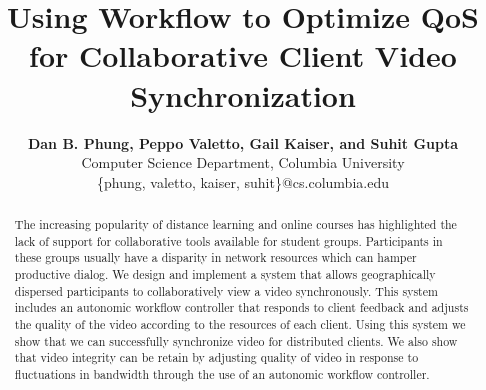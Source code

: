 \documentclass[10pt]{article}
\title{Using Workflow to Optimize QoS for Collaborative Client Video
Synchronization}
\author{
 \textbf{Dan B. Phung, Peppo Valetto, Gail Kaiser, and Suhit Gupta}\\
Computer Science Department, Columbia University\\
\{phung, valetto, kaiser, suhit\}@cs.columbia.edu}
\date{\parbox[b][0ex]{0em}{\hspace*{-12.5em}\raisebox{37ex}{\fbox{For
submission to \emph{ACM-MM 2004}, due 12:00 AM EDT: April 05, 2004.}}}}
\begin{document}
\begin{singlespace}
\maketitle
\end{singlespace}

%
% 
% 
% 
% 
% 
% 



\begin{abstract}\noindent
The increasing popularity of distance learning and online courses has
highlighted the lack of support for collaborative tools available for
student groups.  Participants in these groups usually have a disparity
in network resources which can hamper productive dialog.  We design
and implement a system that allows geographically dispersed
participants to collaboratively view a video synchronously.  This
system includes an autonomic workflow controller that responds to
client feedback and adjusts the quality of the video according to the
resources of each client.  Using this system we show that we can
successfully synchronize video for distributed clients.  We also show
that video integrity can be retain by adjusting quality of video in
response to fluctuations in bandwidth through the use of an autonomic
workflow controller.
\end{abstract}
\end{document}
